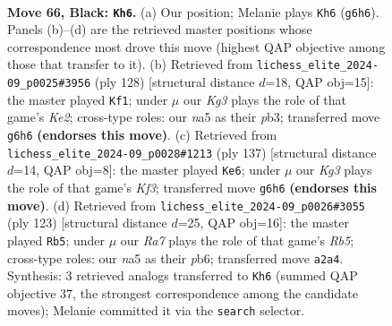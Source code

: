 \documentclass[11pt]{article}
\begin{document}
\clearpage

\begin{figure}[p]\centering
\begin{subfigure}{0.46\textwidth}\centering
\resizebox{\linewidth}{!}{%
\newchessgame
\chessboard[
  setfen={8/6p1/5pk1/NR5p/3P3P/6PK/r7/8 b - - 26 66},
  showmover=false,
  pgfstyle=straightmove, color=movearrow, markmove={g6-h6}
]}
\caption{}
\end{subfigure}\hfill
\begin{subfigure}{0.46\textwidth}\centering
\resizebox{\linewidth}{!}{%
\newchessgame
\chessboard[
  setfen={8/6k1/5p2/6pP/4p1P1/1pr1P3/4KP2/1R6 w - - 34 65},
  showmover=false,
  pgfstyle=straightmove, color=movearrow, markmove={e2-f1}
]}
\caption{}
\end{subfigure}
\\[4pt]
\begin{subfigure}{0.46\textwidth}\centering
\resizebox{\linewidth}{!}{%
\newchessgame
\chessboard[
  setfen={8/5p2/5kp1/2R4p/5P1P/6PK/r7/8 b - - 14 69},
  showmover=false,
  pgfstyle=straightmove, color=movearrow, markmove={f6-e6}
]}
\caption{}
\end{subfigure}\hfill
\begin{subfigure}{0.46\textwidth}\centering
\resizebox{\linewidth}{!}{%
\newchessgame
\chessboard[
  setfen={8/6pk/1PR4p/4P2P/1r6/8/6PK/8 b - - 2 62},
  showmover=false,
  pgfstyle=straightmove, color=movearrow, markmove={b4-b5}
]}
\caption{}
\end{subfigure}
\caption{\textbf{Move 66, Black: \texttt{Kh6}.} (a) Our position; Melanie plays \texttt{Kh6} (\texttt{g6h6}). Panels (b)--(d) are the retrieved master positions whose correspondence most drove this move (highest QAP objective among those that transfer to it). (b) Retrieved from \texttt{lichess\_elite\_2024-09\_p0025\#3956} (ply 128) [structural distance $d$=18, QAP obj=15]: the master played \texttt{Kf1}; under $\mu$ our \emph{Kg3} plays the role of that game's \emph{Ke2}; cross-type roles: our \emph{n}a5 as their \emph{p}b3; transferred move \texttt{g6h6} \textbf{(endorses this move)}. (c) Retrieved from \texttt{lichess\_elite\_2024-09\_p0028\#1213} (ply 137) [structural distance $d$=14, QAP obj=8]: the master played \texttt{Ke6}; under $\mu$ our \emph{Kg3} plays the role of that game's \emph{Kf3}; transferred move \texttt{g6h6} \textbf{(endorses this move)}. (d) Retrieved from \texttt{lichess\_elite\_2024-09\_p0026\#3055} (ply 123) [structural distance $d$=25, QAP obj=16]: the master played \texttt{Rb5}; under $\mu$ our \emph{Ra7} plays the role of that game's \emph{Rb5}; cross-type roles: our \emph{n}a5 as their \emph{p}b6; transferred move \texttt{a2a4}. Synthesis: 3 retrieved analogs transferred to \texttt{Kh6} (summed QAP objective 37, the strongest correspondence among the candidate moves); Melanie committed it via the \texttt{search} selector.}
\label{fig:thought-m131}
\end{figure}
\end{document}
